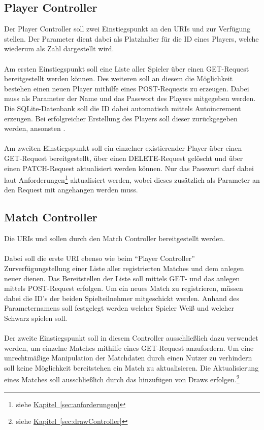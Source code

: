 \subsection{Player Controller}\label{sec:playerController}
Der Player Controller soll zwei Einstiegspunkt an den \glspl{URI}  und  zur Verfügung stellen. Der Parameter  dient dabei als Platzhalter für die ID eines Players, welche wiederum als Zahl dargestellt wird.\\
\\
Am ersten Einstiegspunkt soll eine Liste aller Spieler über einen GET-Request bereitgestellt werden können. Des weiteren soll an diesem die Möglichkeit bestehen einen neuen Player mithilfe eines POST-Requests zu erzeugen. Dabei muss als Parameter der Name und das Passwort des Players mitgegeben werden. Die SQLite-Datenbank soll die ID dabei automatisch mittels Autoincrement erzeugen. Bei erfolgreicher Erstellung des Players soll dieser zurückgegeben werden, ansonsten .\\
\\
Am zweiten Einstiegspunkt soll ein einzelner existierender Player über einen GET-Request bereitgestellt, über einen DELETE-Request gelöscht und über einen PATCH-Request aktualisiert werden können. Nur das Passwort darf dabei laut Anforderungen\footnote{siehe \hyperref[sec:anforderungen]{Kapitel~\ref{sec:anforderungen}}} aktualisiert werden, wobei dieses zusätzlich als Parameter an den Request mit angehangen werden muss.

\subsection{Match Controller}\label{sec:matchController}
Die \glspl{URI}  und  sollen durch den Match Controller bereitgestellt werden. \\
\\
Dabei soll die erste \gls{URI} ebenso wie beim \enquote{Player Controller} Zurverfügungstellung einer Liste aller registrierten Matches und dem anlegen neuer dienen. Das Bereitstellen der Liste soll mittels GET- und das anlegen mittels POST-Request erfolgen. Um ein neues Match zu registrieren, müssen dabei die ID's der beiden Spielteilnehmer mitgeschickt werden. Anhand des Parameternamens soll festgelegt werden welcher Spieler Weiß und welcher Schwarz spielen soll.\\
\\
Der zweite Einstiegspunkt soll in diesem Controller ausschließlich dazu verwendet werden, um einzelne Matches mithilfe eines GET-Request anzufordern. Um eine unrechtmäßige Manipulation der Matchdaten durch einen Nutzer zu verhindern soll keine Möglichkeit bereitstehen ein Match zu aktualisieren. Die Aktualisierung eines Matches soll ausschließlich durch das hinzufügen von Draws erfolgen.\footnote{siehe \hyperref[sec:drawController]{Kapitel~\ref{sec:drawController}}}

